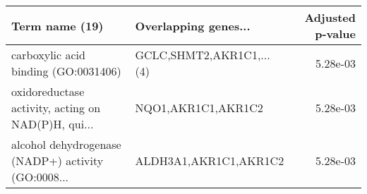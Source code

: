 \begin{tabular}{llr}
\toprule
                                    Term name (19) &     Overlapping genes... &  Adjusted p-value \\
\midrule
              carboxylic acid binding (GO:0031406) & GCLC,SHMT2,AKR1C1,...(4) &          5.28e-03 \\
oxidoreductase activity, acting on NAD(P)H, qui... &       NQO1,AKR1C1,AKR1C2 &          5.28e-03 \\
alcohol dehydrogenase (NADP+) activity (GO:0008... &    ALDH3A1,AKR1C1,AKR1C2 &          5.28e-03 \\
\bottomrule
\end{tabular}
